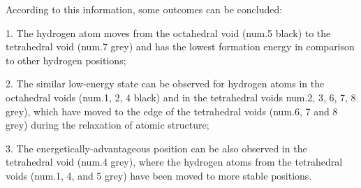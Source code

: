 According to this information, some outcomes can be concluded:

1. The hydrogen atom moves from the octahedral void (num.5 black) to the tetrahedral void (num.7 grey) and has the lowest formation energy in comparison to other hydrogen positions;

2. The similar low-energy state can be observed for hydrogen atoms in the octahedral voids (num.1, 2, 4 black)  and in the tetrahedral voids num.2, 3, 6, 7, 8 grey), which have moved to the edge of the tetrahedral voids (num.6, 7 and 8 grey) during the relaxation of atomic structure;

3. The energetically-advantageous position can be also observed in the tetrahedral void (num.4 grey), where the hydrogen atoms from the tetrahedral voids (num.1, 4, and 5 grey) have been moved to more stable positions.

